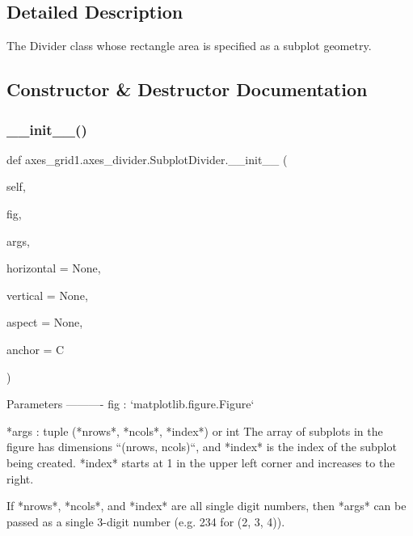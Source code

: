 \subsection{Detailed Description}
\begin{DoxyVerb}The Divider class whose rectangle area is specified as a subplot geometry.
\end{DoxyVerb}
 

\subsection{Constructor \& Destructor Documentation}
\mbox{\label{classaxes__grid1_1_1axes__divider_1_1SubplotDivider_adaf9b883194737fe03564c33d74f7cdd}} 
\subsubsection{\texorpdfstring{\+\_\+\+\_\+init\+\_\+\+\_\+()}{\_\_init\_\_()}}
{\footnotesize\ttfamily def axes\+\_\+grid1.\+axes\+\_\+divider.\+Subplot\+Divider.\+\_\+\+\_\+init\+\_\+\+\_\+ (\begin{DoxyParamCaption}\item[{}]{self,  }\item[{}]{fig,  }\item[{}]{args,  }\item[{}]{horizontal = {\ttfamily None},  }\item[{}]{vertical = {\ttfamily None},  }\item[{}]{aspect = {\ttfamily None},  }\item[{}]{anchor = {\ttfamily \textquotesingle{}C\textquotesingle{}} }\end{DoxyParamCaption})}

\begin{DoxyVerb}Parameters
----------
fig : `matplotlib.figure.Figure`

*args : tuple (*nrows*, *ncols*, *index*) or int
    The array of subplots in the figure has dimensions ``(nrows,
    ncols)``, and *index* is the index of the subplot being created.
    *index* starts at 1 in the upper left corner and increases to the
    right.

    If *nrows*, *ncols*, and *index* are all single digit numbers, then
    *args* can be passed as a single 3-digit number (e.g. 234 for
    (2, 3, 4)).
\end{DoxyVerb}
 

